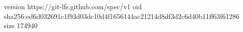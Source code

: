 version https://git-lfs.github.com/spec/v1
oid sha256:ed6d032691c1f93d03dc10d4f1656144ac21214d8df3d2c6d40b11ff63f61286
size 174940
